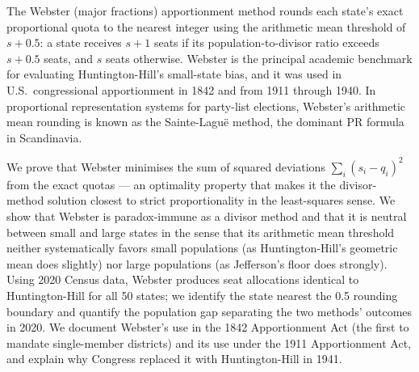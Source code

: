 The Webster (major fractions) apportionment method rounds each state's
exact proportional quota to the nearest integer using the arithmetic
mean threshold of $s + 0.5$: a state receives $s+1$ seats if its
population-to-divisor ratio exceeds $s + 0.5$ seats, and $s$ seats
otherwise.
Webster is the principal academic benchmark for evaluating Huntington-Hill's
small-state bias, and it was used in U.S.\ congressional apportionment
in 1842 and from 1911 through 1940.
In proportional representation systems for party-list elections,
Webster's arithmetic mean rounding is known as the Sainte-Lagu\"e method,
the dominant PR formula in Scandinavia.

We prove that Webster minimises the sum of squared deviations
$\sum_i (s_i - q_i)^2$ from the exact quotas --- an optimality
property that makes it the divisor-method solution closest to
strict proportionality in the least-squares sense.
We show that Webster is paradox-immune as a divisor method and
that it is neutral between small and large states in the sense that
its arithmetic mean threshold neither systematically favors
small populations (as Huntington-Hill's geometric mean does slightly)
nor large populations (as Jefferson's floor does strongly).
Using 2020 Census data, Webster produces seat allocations identical
to Huntington-Hill for all 50 states;
we identify the state nearest the 0.5 rounding boundary
and quantify the population gap separating the two methods'
outcomes in 2020.
We document Webster's use in the 1842 Apportionment Act (the first
to mandate single-member districts) and its use under the 1911
Apportionment Act, and explain why Congress replaced it with
Huntington-Hill in 1941.
